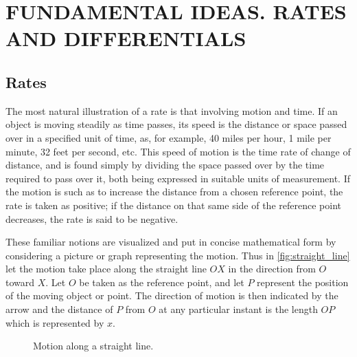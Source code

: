

\chapter{FUNDAMENTAL IDEAS. RATES AND DIFFERENTIALS}

\section{Rates}
The most natural illustration of a rate is that involving motion and time. If an object is moving steadily as time passes, its speed is the distance or space passed over in a specified unit of time, as, for example, 40 miles per hour, 1 mile per minute, 32 feet per second, etc. This speed of motion is the time rate of change of distance, and is found simply by dividing the space passed over by the time required to pass over it, both being expressed in suitable units of measurement. If the motion is such as to increase the distance from a chosen reference point, the rate is taken as positive; if the distance on that same side of the reference point decreases, the rate is said to be negative.

These familiar notions are visualized and put in concise mathematical form by considering a picture or graph representing the motion. Thus in \autoref{fig:straight_line} let the motion take place along the straight line $OX$ in the direction from $O$ toward $X$. Let $O$ be taken as the reference point, and let $P$ represent the position of the moving object or point. The direction of motion is then indicated by the arrow and the distance of $P$ from $O$ at any particular instant is the length $OP$ which is represented by $x$.

\begin{figure}
\centering
{}
\caption{Motion along a straight line.}
\label{fig:straight_line}
\end{figure}

